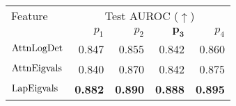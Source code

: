 \begin{tabular}{lrrrr}
\toprule
Feature & \multicolumn{4}{c}{Test AUROC ($\uparrow$)} \\
\cmidrule(lr){2-5}
& $p_1$ & $p_2$ & $\boldsymbol{p_3}$ & $p_4$ \\
\midrule
$\operatorname{AttnLogDet}$ & 0.847 & 0.855 & 0.842 & 0.860 \\
$\operatorname{AttnEigvals}$ & 0.840 & 0.870 & 0.842 & 0.875 \\
$\operatorname{LapEigvals}$ & \textbf{0.882} & \textbf{0.890} & \textbf{0.888} & \textbf{0.895} \\
\bottomrule
\end{tabular}